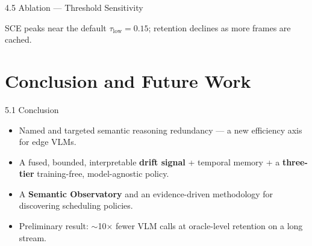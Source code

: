 \documentclass[11pt,aspectratio=169]{beamer}
\begin{document}
\begin{frame}{4.5 Ablation --- Threshold Sensitivity}
\centering
{}

\footnotesize SCE peaks near the default $\tau_{\text{low}}=0.15$; retention declines as more frames are cached.
\end{frame}

\section{Conclusion and Future Work}

\begin{frame}{5.1 Conclusion}
\begin{itemize}
  \item Named and targeted \alert{semantic reasoning redundancy} --- a new efficiency axis for edge VLMs.
  \item A fused, bounded, interpretable \textbf{drift signal} + temporal memory + a \textbf{three-tier} training-free, model-agnostic policy.
  \item A \textbf{Semantic Observatory} and an evidence-driven methodology for discovering scheduling policies.
  \item Preliminary result: \alert{$\sim$10$\times$ fewer VLM calls at oracle-level retention} on a long stream.
\end{itemize}
\end{frame}
\end{document}
